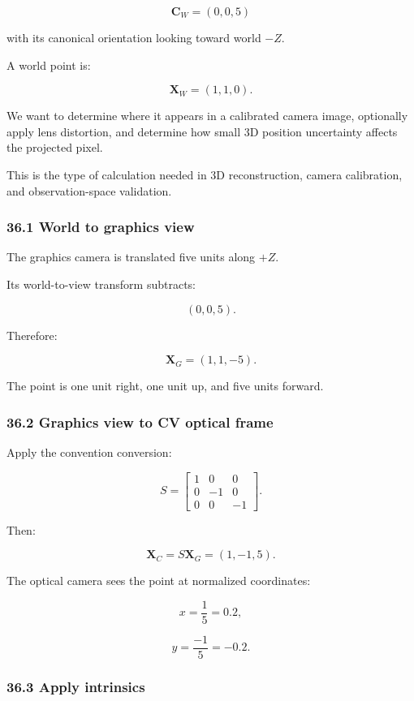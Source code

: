 \[
 \mathbf C_W=(0,0,5)
\]

with its canonical orientation looking toward world \(-Z\).

A world point is:

\[
 \mathbf X_W=(1,1,0).
\]

We want to determine where it appears in a calibrated camera image, optionally apply lens distortion, and determine how small 3D position uncertainty affects the projected pixel.

This is the type of calculation needed in 3D reconstruction, camera calibration, and observation-space validation.

\subsubsection{36.1 World to graphics view}\label{02-foundations-ii-ch037-world-to-graphics-view}

The graphics camera is translated five units along \(+Z\).

Its world-to-view transform subtracts:

\[
 (0,0,5).
\]

Therefore:

\[
 \boxed{ \mathbf X_G=(1,1,-5) }.
\]

The point is one unit right, one unit up, and five units forward.

\subsubsection{36.2 Graphics view to CV optical frame}\label{02-foundations-ii-ch037-graphics-view-to-cv-optical-frame}

Apply the convention conversion:

\[
 S= \begin{bmatrix} 1&0&0\\ 0&-1&0\\ 0&0&-1 \end{bmatrix}.
\]

Then:

\[
 \boxed{ \mathbf X_C=S\mathbf X_G=(1,-1,5) }.
\]

The optical camera sees the point at normalized coordinates:

\[
 x=\frac15=0.2,
\]

\[
 y=\frac{-1}{5}=-0.2.
\]

\subsubsection{36.3 Apply intrinsics}\label{02-foundations-ii-ch037-apply-intrinsics}


